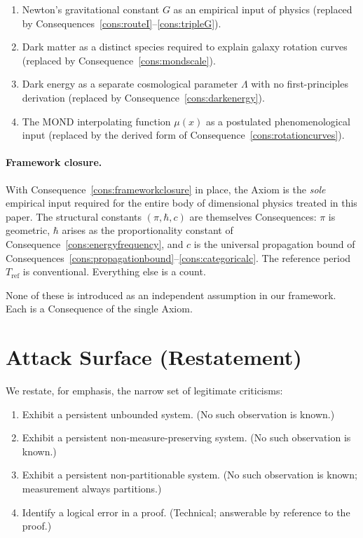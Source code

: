 \documentclass[11pt,twocolumn,a4paper]{article}
\theoremstyle{axiomstyle}
\theoremstyle{conseqstyle}
\theoremstyle{definition}
\theoremstyle{remark}
\begin{document}
\begin{enumerate}
\item Newton's gravitational constant $G$ as an empirical input of physics (replaced by Consequences~\ref{cons:routeI}--\ref{cons:tripleG}).
\item Dark matter as a distinct species required to explain galaxy rotation curves (replaced by Consequence~\ref{cons:mondscale}).
\item Dark energy as a separate cosmological parameter $\Lambda$ with no first-principles derivation (replaced by Consequence~\ref{cons:darkenergy}).
\item The MOND interpolating function $\mu(x)$ as a postulated phenomenological input (replaced by the derived form of Consequence~\ref{cons:rotationcurves}).
\end{enumerate}

\paragraph{Framework closure.} With Consequence~\ref{cons:frameworkclosure} in place, the Axiom is the \emph{sole} empirical input required for the entire body of dimensional physics treated in this paper. The structural constants $(\pi,\hbar,c)$ are themselves Consequences: $\pi$ is geometric, $\hbar$ arises as the proportionality constant of Consequence~\ref{cons:energyfrequency}, and $c$ is the universal propagation bound of Consequences~\ref{cons:propagationbound}--\ref{cons:categoricalc}. The reference period $T_{\mathrm{ref}}$ is conventional. Everything else is a count.

None of these is introduced as an independent assumption in our framework. Each is a Consequence of the single Axiom.

\section{Attack Surface (Restatement)}
\label{sec:attackrestate}

We restate, for emphasis, the narrow set of legitimate criticisms:

\begin{enumerate}[label=(A\arabic*)]
  \item Exhibit a persistent unbounded system. (No such observation is known.)
  \item Exhibit a persistent non-measure-preserving system. (No such observation is known.)
  \item Exhibit a persistent non-partitionable system. (No such observation is known; measurement always partitions.)
  \item Identify a logical error in a proof. (Technical; answerable by reference to the proof.)
\end{enumerate}
\end{document}
